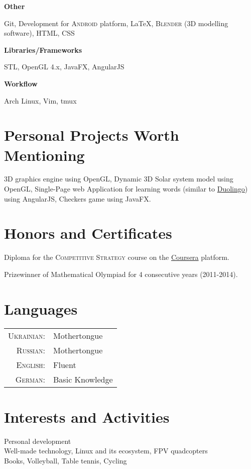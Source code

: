 \documentclass[10pt]{article}
\begin{document}
\begin{center} \large \textbf{Other} \end{center}
Git, \hspace{0.3em}
Development for \textsc{Android} platform, \hspace{0.3em}
{\fb \LaTeX}, \hspace{0.3em}
\textsc{Blender} (3D modelling software), \hspace{0.3em}
HTML, CSS

\begin{center} \large \textbf{Libraries\slash Frameworks} \end{center}
STL, \hspace{0.3em}
OpenGL 4.x, \hspace{0.3em}
JavaFX, \hspace{0.3em}
AngularJS

\begin{center} \large \textbf{Workflow} \end{center}
Arch Linux, \hspace{0.3em}
Vim, \hspace{0.3em}
tmux

\section{Personal Projects Worth Mentioning}
3D graphics engine using OpenGL, Dynamic 3D Solar system model using OpenGL, Single-Page web Application for learning words (similar to \href{https://www.duolingo.com/}{Duolingo}) using AngularJS, Checkers game using JavaFX.

\section{Honors and Certificates}
Diploma for the \textsc{Competitive Strategy} course on the \href{https://www.coursera.org/learn/competitive-strategy}{Coursera} platform. \par
Prizewinner of Mathematical Olympiad for 4 consecutive years (2011-2014).

\section{Languages}
\begin{tabular}{rl}
\textsc{Ukrainian:}&Mothertongue\\
\textsc{Russian:}	 &Mothertongue\\
\textsc{English:}	 &Fluent\\
\textsc{German:}	 &Basic Knowledge\\
\end{tabular}

\section{Interests and Activities}
Personal development \\
Well-made technology, Linux and its ecosystem, FPV quadcopters \\
Books, Volleyball, Table tennis, Cycling
\end{document}
